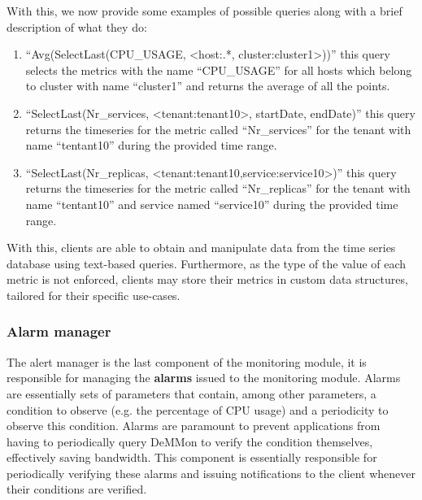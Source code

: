  With this, we now provide some examples of possible queries along with a brief description of what they do:

\begin{enumerate}
    \item ``Avg(SelectLast(CPU\_USAGE, <host:.*, cluster:cluster1>))'' this query selects the metrics with the name ``CPU\_USAGE'' for all hosts which belong to cluster with name ``cluster1'' and returns the average of all the points.
    
    \item ``SelectLast(Nr\_services, <tenant:tenant10>, startDate, endDate)'' this query returns the timeseries for the metric called ``Nr\_services'' for the tenant with name ``tentant10'' during the provided time range.

    \item ``SelectLast(Nr\_replicas, <tenant:tenant10,service:service10>)'' this query returns the timeseries for the metric called ``Nr\_replicas'' for the tenant with name ``tentant10'' and service named ``service10'' during the provided time range.
    
    
\end{enumerate}

With this, clients are able to obtain and manipulate data from the time series database using text-based queries. Furthermore, as the type of the value of each metric is not enforced, clients may store their metrics in custom data structures, tailored for their specific use-cases.

\subsubsection{Alarm manager} \label{sec:mon_module:alarm_monitor}

The alert manager is the last component of the monitoring module, it is responsible for managing the \textbf{alarms} issued to the monitoring module. Alarms are essentially sets of parameters that contain, among other parameters, a condition to observe (e.g. the percentage of CPU usage) and a periodicity to observe this condition. Alarms are paramount to prevent applications from having to periodically query DeMMon to verify the condition themselves, effectively saving bandwidth. This component is essentially responsible for periodically verifying these alarms and issuing notifications to the client whenever their conditions are verified. 

